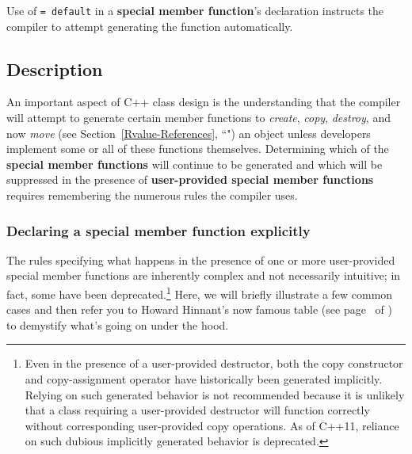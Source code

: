 \label{defaulted-special-member-functions}



Use of \texttt{=}~\texttt{default} in a \textbf{special member function}'s
declaration instructs the compiler to attempt generating the function
automatically.

\subsection[Description]{Description}\label{description}

An important aspect of C++ class design is the understanding that the
compiler will attempt to generate certain member functions to
\emph{create}, \emph{copy}, \emph{destroy}, and now
\emph{move} (see Section~\ref{Rvalue-References}, ``") an object unless
developers implement some or all of these functions
themselves. Determining which of the \textbf{special member functions}
will continue to be generated and which will be suppressed in the
presence of \textbf{user-provided special member functions}
requires remembering the numerous rules the compiler uses.

\subsubsection[Declaring a special member function explicitly]{Declaring a special member function explicitly}\label{declaring-a-special-member-function-explicitly}

The rules specifying what happens in the presence of one or more
user-provided special member functions are inherently complex and not
necessarily intuitive; in fact, some have been
deprecated.{\cprotect\footnote{Even in the presence of a user-provided
destructor, both the copy constructor and copy-assignment operator
have historically been generated implicitly. Relying on such generated
behavior is not recommended because it is unlikely that a class
requiring a user-provided destructor will function correctly without
corresponding user-provided copy operations. As of C++11, reliance on
  such dubious implicitly generated behavior is deprecated.}} Here, we
will briefly illustrate a few common cases and then refer you to Howard
Hinnant's now famous table (see page~\pageref{default-table1} of {\it{}}) to
demystify what's going on under the hood.


